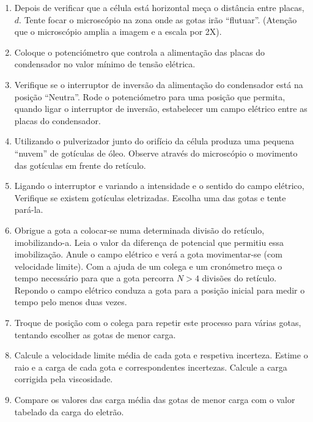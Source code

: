 \documentclass[a4paper,twoside,12pt]{article}      %
\begin{document}
\begin{enumerate}
\item   Depois de verificar que a célula está horizontal  meça o distância entre placas, $d$. Tente focar o microscópio na zona onde as gotas irão ``flutuar''. (Atenção que o microscópio amplia a imagem e a escala por 2X).
\item Coloque o potenciómetro que 
controla a alimentação das placas do condensador no valor mínimo de tensão elétrica. 
\item    Verifique se o interruptor de inversão da alimentação do condensador está na posição ``Neutra''.
Rode o potenciómetro para uma posição que permita, quando ligar o interruptor de inversão, estabelecer um campo elétrico entre as placas do condensador. 
\item     Utilizando o pulverizador junto do orifício da célula produza uma pequena ``nuvem'' %
de gotículas de óleo. Observe através do microscópio o movimento das gotículas em 
frente do retículo.
\item     Ligando o interruptor e variando a intensidade  e o  sentido do campo elétrico, Verifique se existem gotículas eletrizadas. Escolha uma das gotas e tente pará-la.
 \item Obrigue a gota a colocar-se numa determinada divisão do retículo, imobilizando-a. 
Leia o valor da diferença de potencial que permitiu essa imobilização. Anule o 
campo elétrico  e verá a gota movimentar-se (com velocidade limite). Com a ajuda de um colega e um 
cronómetro meça o tempo necessário para que a gota percorra  $N>4$ divisões
do retículo. Repondo o campo elétrico conduza a gota para a posição inicial para  medir o tempo pelo menos duas vezes. 
\item Troque de posição com o colega para repetir este processo para várias gotas, tentando escolher as gotas de menor carga.
\item   Calcule a velocidade limite média de cada gota e respetiva incerteza. Estime o raio e 
a carga de cada gota e correspondentes incertezas. Calcule a carga corrigida pela viscosidade.
\item   Compare os valores das carga média das gotas de menor carga  com o valor tabelado da carga do eletrão. 
\end{enumerate}



\end{document}
